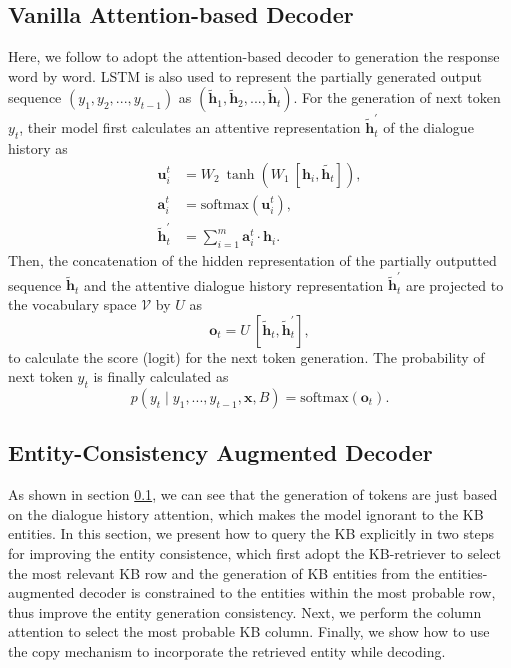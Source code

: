 \documentclass[11pt,a4paper]{article}
\begin{document}
\subsection{Vanilla Attention-based Decoder}\label{sec:method:vanilla-decoder}

Here, we follow  to adopt the attention-based decoder to generation the response word by word.
LSTM is also used to represent the partially generated output sequence $(y_{1}, y_2, ...,y_{t-1})$
as $(\tilde{\mathbf{h}}_{1}, \tilde{\mathbf{h}}_2, ...,\tilde {\mathbf{h}}_t)$.
For the generation of next token $y_t$, their model
first calculates an attentive representation $\tilde{\mathbf{h}}^{'}_t$ of the dialogue history as
\begin{align*}
\mathbf{u}^{t}_{i} & = W_{2}\  \tanh(W_{1}\ [\mathbf{h}_{i}, \tilde {\mathbf{h}_{t}}]), \\
\mathbf{a}^t_{i} & = \text{softmax} (\mathbf{u}^t_{i}), \\
\tilde{\mathbf{h}}^{'}_t & = \sum ^{m}_{i=1} \mathbf{a}^t_{i}\cdot \mathbf{h}_{i}.
\end{align*}
Then, the concatenation of the hidden representation of the partially outputted sequence $\tilde{\mathbf{h}}_t$
and the attentive dialogue history representation $\tilde{\mathbf{h}}^{'}_t$
are projected to the vocabulary space $\mathcal{V}$ by $U$ as
\[\mathbf{o}_t = U\ [\tilde{\mathbf{h}}_t, \tilde{\mathbf{h}}^{'}_t], \]
to calculate the score (logit) for the next token generation.
The probability of next token $y_t$  is finally calculated as
\[p(y_t \mid y_1, ..., y_{t-1}, \mathbf{x}, B) = \text{softmax}(\mathbf{o}_t).\]

\subsection{Entity-Consistency Augmented Decoder}
As shown in section \ref{sec:method:vanilla-decoder}, we can see that the generation of tokens are just based on the dialogue history attention, which makes the model ignorant to the KB entities.
In this section, we present how to query the KB explicitly in two steps for improving the entity consistence,
which first adopt the KB-retriever to select the most relevant KB row and the generation of KB entities from the entities-augmented decoder is constrained to the entities within the most probable row, thus improve the entity generation consistency.
Next, we perform the column attention to select the most probable KB column.
Finally, we show how to use the copy mechanism to incorporate the retrieved entity while decoding.
\end{document}
